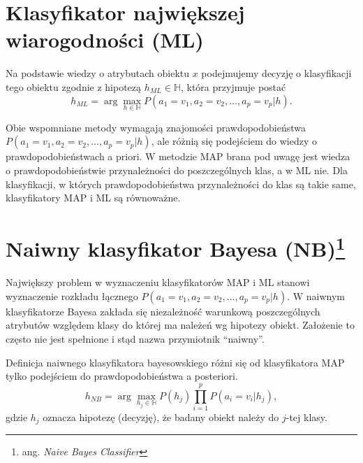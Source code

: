 \documentclass[]{book}
\let\rmarkdownfootnote\footnote%
\def\footnote{\protect\rmarkdownfootnote}
\theoremstyle{plain}
\theoremstyle{definition}
\theoremstyle{definition}
\theoremstyle{definition}
\theoremstyle{definition}
\theoremstyle{remark}
\let\BeginKnitrBlock\begin \let\EndKnitrBlock\end
\begin{document}
\hypertarget{klasyfikator-najwiekszej-wiarogodnosci-ml}{%
\section{Klasyfikator największej wiarogodności (ML)}\label{klasyfikator-najwiekszej-wiarogodnosci-ml}}

Na podstawie wiedzy o atrybutach obiektu \(x\) podejmujemy decyzję o klasyfikacji tego obiektu zgodnie z hipotezą \(h_{ML}\in \mathbb{H}\), która przyjmuje postać
\begin{equation}\label{ML}
        h_{ML}=\operatorname{arg}\max_{h\in \mathbb{H}}P(a_1=v_1, a_2=v_2,\ldots,a_p=v_p|h).
\end{equation}

\BeginKnitrBlock{remark}
{}Obie wspomniane metody wymagają znajomości prawdopodobieństwa \(P(a_1=v_1,a_2=v_2,\ldots,a_p=v_p|h)\), ale różnią się podejściem do wiedzy o prawdopodobieństwach a priori. W metodzie MAP brana pod uwagę jest wiedza o prawdopodobieństwie przynależności do poszczególnych klas, a w ML nie. Dla klasyfikacji, w których prawdopodobieństwa przynależności do klas są takie same, klasyfikatory MAP i ML są równoważne.
\EndKnitrBlock{remark}

\hypertarget{naiwny-klasyfikator-bayesa-nb}{%
\section[Naiwny klasyfikator Bayesa (NB)]{\texorpdfstring{Naiwny klasyfikator Bayesa (NB)\footnote{ang. \emph{Naive Bayes Classifier}}}{Naiwny klasyfikator Bayesa (NB)}}\label{naiwny-klasyfikator-bayesa-nb}}

Największy problem w wyznaczeniu klasyfikatorów MAP i ML stanowi wyznaczenie rozkładu łącznego \(P(a_1=v_1, a_2=v_2,\ldots,a_p=v_p|h)\). W naiwnym klasyfikatorze Bayesa zakłada się niezależność warunkową poszczególnych atrybutów względem klasy do której ma należeń wg hipotezy obiekt. Założenie to często nie jest spełnione i stąd nazwa przymiotnik ``naiwny''.

Definicja naiwnego klasyfikatora bayesowskiego różni się od klasyfikatora MAP tylko podejściem do prawdopodobieństwa a posteriori.
\begin{equation}\label{naiwny_bayes}
        h_{NB}=\operatorname{arg}\max_{h_j\in \mathbb{H}}P(h_j)\prod_{i=1}^{p}P(a_i=v_i|h_j),
\end{equation}
gdzie \(h_j\) oznacza hipotezę (decyzję), że badany obiekt należy do \(j\)-tej klasy.
\end{document}
